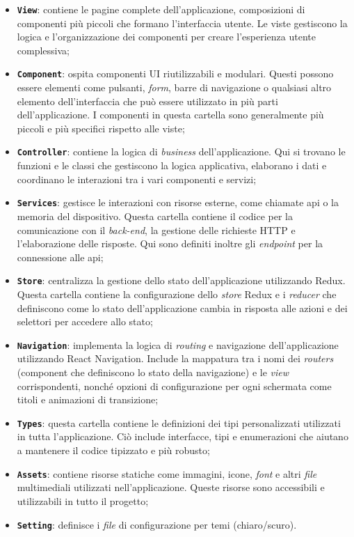 \begin{itemize}
      \item \textbf{\texttt{View}}: contiene le pagine complete dell'applicazione, composizioni di 
            componenti più piccoli che formano l'interfaccia utente. Le viste gestiscono la logica e 
            l'organizzazione dei componenti per creare l'esperienza utente complessiva;
      \item \textbf{\texttt{Component}}: ospita componenti UI riutilizzabili e modulari. Questi possono 
            essere elementi come pulsanti, \textit{form}, barre di navigazione o qualsiasi altro elemento 
            dell'interfaccia che può essere utilizzato in più parti dell'applicazione. I componenti in 
            questa cartella sono generalmente più piccoli e più specifici rispetto alle viste;
      \item \textbf{\texttt{Controller}}: contiene la logica di \textit{business} dell'applicazione. Qui 
            si trovano le funzioni e le classi che gestiscono la logica applicativa, elaborano i dati e coordinano le 
            interazioni tra i vari componenti e servizi;
      \item \textbf{\texttt{Services}}: gestisce le interazioni con risorse esterne, come chiamate \gls{api} o la memoria
            del dispositivo. Questa cartella contiene il codice per la comunicazione con il \textit{back-end}, la gestione delle 
            richieste HTTP e l'elaborazione delle risposte. Qui sono definiti inoltre gli \textit{endpoint} per la connessione 
            alle \gls{api};
      \item \textbf{\texttt{Store}}: centralizza la gestione dello stato dell'applicazione utilizzando Redux. Questa cartella 
            contiene la configurazione dello \textit{store} Redux e i \textit{reducer} che definiscono come lo stato dell'applicazione 
            cambia in risposta alle azioni e  dei selettori per accedere allo stato;
      \item \textbf{\texttt{Navigation}}: implementa la logica di \textit{routing} e navigazione dell'applicazione utilizzando 
            React Navigation. Include la mappatura tra i nomi dei \textit{routers} (component che definiscono lo stato della navigazione) 
            e le \textit{view} corrispondenti, nonché opzioni di configurazione per ogni schermata come titoli e animazioni di transizione;
      \item \textbf{\texttt{Types}}: questa cartella contiene le definizioni dei tipi personalizzati utilizzati in tutta l'applicazione. 
            Ciò include interfacce, tipi e enumerazioni che aiutano a mantenere il codice tipizzato e più robusto;
      \item \textbf{\texttt{Assets}}: contiene risorse statiche come immagini, icone, \textit{font} e altri \textit{file} multimediali 
            utilizzati nell'applicazione. Queste risorse sono accessibili e utilizzabili in tutto il progetto;
      \item \textbf{\texttt{Setting}}: definisce i \textit{file} di configurazione per temi (chiaro/scuro).
\end{itemize}
